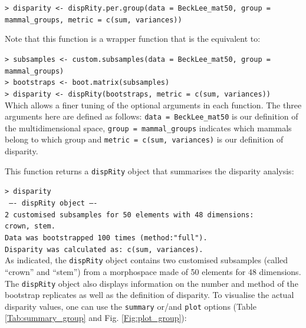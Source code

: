 \documentclass[12pt,letterpaper]{article}
\newcommand{\disp}{\texttt{dispRity} }
\begin{document}
\noindent \texttt{> disparity <- dispRity.per.group(data = BeckLee\_mat50, group = mammal\_groups, metric = c(sum, variances))}

\noindent Note that this function is a wrapper function that is the equivalent to:

\noindent \texttt{> subsamples <- custom.subsamples(data = BeckLee\_mat50, group = mammal\_groups)}\\
\noindent \texttt{> bootstraps <- boot.matrix(subsamples)}\\
\noindent \texttt{> disparity <- dispRity(bootstraps, metric = c(sum, variances))}\\

\noindent Which allows a finer tuning of the optional arguments in each function.
The three arguments here are defined as follows: \texttt{data = BeckLee\_mat50} is our definition of the multidimensional space, \texttt{group = mammal\_groups} indicates which mammals belong to which group and \texttt{metric = c(sum, variances)} is our definition of disparity. 

This function returns a \disp object that summarises the disparity analysis:

\noindent \texttt{> disparity}\\
\noindent \texttt{ ---- dispRity object ---- }\\
\noindent \texttt{2 customised subsamples for 50 elements with 48 dimensions:}\\
          \texttt{crown, stem.}\\
\noindent \texttt{Data was bootstrapped 100 times (method:"full").}\\
\noindent \texttt{Disparity was calculated as: c(sum, variances).}\\

\bigskip
As indicated, the \disp object contains two customised subsamples (called ``crown'' and ``stem'') from a morphospace made of 50 elements for 48 dimensions.
The \disp object also displays information on the number and method of the bootstrap replicates as well as the definition of disparity.
To visualise the actual disparity values, one can use the \texttt{summary} or/and \texttt{plot} options (Table \ref{Tab:summary_group} and Fig. \ref{Fig:plot_group}):


\end{document}
